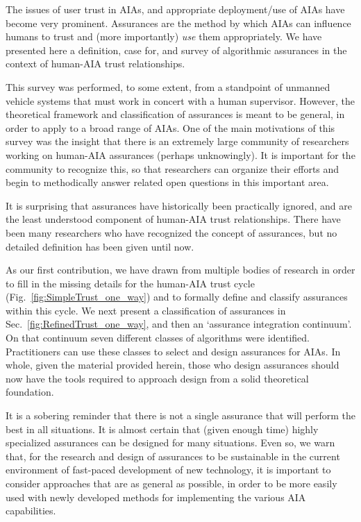 The issues of user trust in AIAs, and appropriate deployment/use of AIAs have become very prominent. Assurances are the method by which AIAs can influence humans to trust and (more importantly) \emph{use} them appropriately. We have presented here a definition, case for, and survey of algorithmic assurances in the context of human-AIA trust relationships. 
    
This survey was performed, to some extent, from a standpoint of unmanned vehicle systems that must work in concert with a human supervisor. However, the theoretical framework and classification of assurances is meant to be general, in order to apply to a broad range of AIAs. One of the main motivations of this survey was the insight that there is an extremely large community of researchers working on human-AIA assurances (perhaps unknowingly). It is important for the community to recognize this, so that researchers can organize their efforts and begin to methodically answer related open questions in this important area.

It is surprising that assurances have historically been practically ignored, and are the least understood component of human-AIA trust relationships. There have been many researchers who have recognized the concept of assurances, but no detailed definition has been given until now.

As our first contribution, we have drawn from multiple bodies of research in order to fill in the missing details for the human-AIA trust cycle (Fig.~\ref{fig:SimpleTrust_one_way}) and to formally define and classify assurances within this cycle. We next present a classification of assurances in Sec.~\ref{fig:RefinedTrust_one_way}, and then an `assurance integration continuum'. On that continuum seven different classes of algorithms were identified. Practitioners can use these classes to select and design assurances for AIAs. In whole, given the material provided herein, those who design assurances should now have the tools required to approach design from a solid theoretical foundation.

It is a sobering reminder that there is not a single assurance that will perform the best in all situations. It is almost certain that (given enough time) highly specialized assurances can be designed for many situations. Even so, we warn that, for the research and design of assurances to be sustainable in the current environment of fast-paced development of new technology, it is important to consider approaches that are as general as possible, in order to be more easily used with newly developed methods for implementing the various AIA capabilities.

